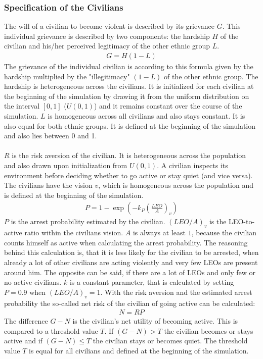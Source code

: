 \documentclass[11pt]{article}
\begin{document}
\subsubsection{Specification of the Civilians}
The will of a civilian to become violent is described by its grievance $G$. This individual grievance is described by two components: the hardship $H$ of the civilian and his/her perceived legitimacy of the other ethnic group $L$.
\begin{align}
G = H (1 - L)
\end{align}
The grievance of the individual civilian is according to this formula given by the hardship multiplied by the "illegitimacy" $(1 - L)$ of the other ethnic group. The hardship is heterogeneous across the civilians. It is initialized for each civilian at the beginning of the simulation by drawing it from the uniform distribution on the interval $[0,1]$ ($U(0,1)$) and it remains constant over the course of the simulation. $L$ is homogeneous across all civilians and also stays constant. It is also equal for both ethnic groups. It is defined at the beginning of the simulation and also lies between 0 and 1.\\
\\
$R$ is the risk aversion of the civilian. It is heterogeneous across the population and also drawn upon initialization from $U(0,1)$. A civilian inspects its environment before deciding whether to go active or stay quiet (and vice versa). The civilians have the vision $v$, which is homogeneous across the population and is defined at the beginning of the simulation.
\begin{align}
P = 1 - \exp \left( - k_P \left( \frac{LEO}{A} \right)_v \right)
\end{align}
$P$ is the arrest probability estimated by the civilian. $\left(LEO/A\right)_v$ is the LEO-to-active ratio within the civilians vision. $A$ is always at least $1$, because the civilian counts himself as active when calculating the arrest probability. The reasoning behind this calculation is, that it is less likely for the civilian to be arrested, when already a lot of other civilians are acting violently and very few LEOs are present around him. The opposite can be said, if there are a lot of LEOs and only few or no active civilians. $k$ is a constant parameter, that is calculated by setting $P = 0.9$ when $\left(LEO/A\right)_v = 1$. With the risk aversion and the estimated arrest probability the so-called net risk of the civilian of going active can be calculated:
\begin{align}
N = RP
\end{align}
The difference $G - N$ is the civilian's net utility of becoming active. This is compared to a threshold value $T$. If $(G - N) > T$ the civilian becomes or stays active and if $(G - N) \leq T$ the civilian stays or becomes quiet. The threshold value $T$ is equal for all civilians and defined at the beginning of the simulation.
\end{document}
